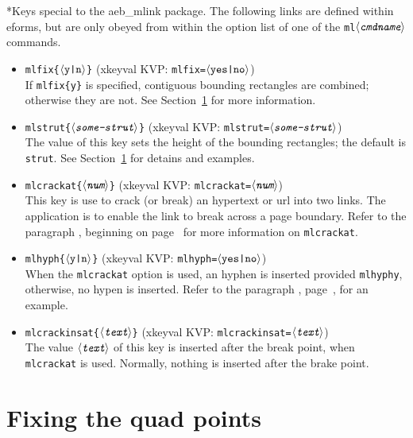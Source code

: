 \documentclass{article}
\makeatletter
\def\anglemeta#1{$\langle\textit{\texttt{#1}}\rangle$}
\let\ameta\anglemeta
\def\darg#1{\texttt{\{#1\}}}
\let\pkg\textsf
\def\cs#1{\texttt{\@backslashchar#1}}
\renewcommand{\paragraph}
    {\@startsection{paragraph}{4}{0pt}{6pt}{-3pt}{\bfseries}}
\makeatother
\begin{document}
\paragraph*{Keys special to the \pkg{aeb\_mlink} package.} The following links are defined
within \pkg{eforms}, but are only obeyed from within the option list of one of the
\cs{ml\ameta{cmdname}} commands.
\begin{itemize}
\item \cs{mlfix\darg{\ameta{\upshape{y|n}}}} (\pkg{xkeyval} KVP: \texttt{mlfix=\ameta{\upshape{yes|no}}})\\
      If \cs{mlfix\darg{y}} is specified, contiguous bounding rectangles are combined; otherwise they are not.
      See Section~\ref{s:FixQuads} for more information.
\item \cs{mlstrut\darg{\ameta{some-strut}}} (\pkg{xkeyval} KVP: \texttt{mlstrut=\ameta{some-strut}})\\
     The value of this key sets the height of the bounding rectangles; the default is \cs{strut}. See
     Section~\ref{s:FixQuads} for detains and examples.
\item \cs{mlcrackat\darg{\ameta{num}}} (\pkg{xkeyval} KVP: \texttt{mlcrackat=\ameta{num}})\\
     This key is use to crack (or break) an hypertext or url into two links.
     The application is to enable the link to break across a page boundary. Refer
     to the paragraph \textbf{}, beginning on page~\pageref{para:xpage}
     for more information on \cs{mlcrackat}.
\item \cs{mlhyph\darg{\ameta{\upshape{y|n}}}} (\pkg{xkeyval} KVP: \texttt{mlhyph=\ameta{\upshape{yes|no}}})\\
    When the \cs{mlcrackat} option is used, an hyphen is inserted provided \cs{mlhyph{y}}, otherwise, no hypen
    is inserted. Refer to the paragraph \textbf{}, page~\pageref{spara:fixxpage}, for
    an example.
\item \cs{mlcrackinsat\darg{\ameta{text}}} (\pkg{xkeyval} KVP: \texttt{mlcrackinsat=\ameta{text}})\\
    The value \ameta{text} of this key is inserted after the break point, when
    \cs{mlcrackat} is used. Normally, nothing is inserted after the brake point.
\end{itemize}

\section{Fixing the quad points}\label{s:FixQuads}
\end{document}
